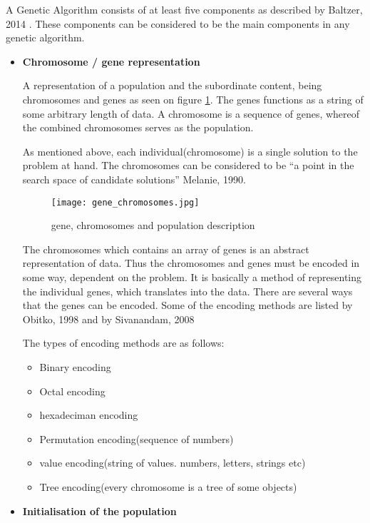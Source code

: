 A Genetic Algorithm consists of at least five components as described by Baltzer, 2014 \cite{Baltzer2014}. These components can be considered to be the main components in any genetic algorithm.
\begin{itemize}
\item \textbf{Chromosome / gene representation}

A representation of a population and the subordinate content, being chromosomes and genes as seen on figure \ref{fig:gene}.
The genes functions as a string of some arbitrary length of data. A chromosome is a sequence of genes, whereof the combined chromosomes serves as the population. \cite[pp. 41]{Sivanandam2008} 

As mentioned above, each individual(chromosome) is a single solution to the problem at hand. The chromosomes can be considered to be \enquote{a point in the search space of candidate solutions} \cite[pp. 7]{Melanie1990} Melanie, 1990.
	

\begin{figure}[!h]
\centering
\texttt{[image: gene\_chromosomes.jpg]}
\caption{gene, chromosomes and population description}
\label{fig:gene}
\end{figure}

The chromosomes which contains an array of genes is an abstract representation of data. Thus the chromosomes and genes must be encoded in some way, dependent on the problem. It is basically a method of representing the individual genes, which translates into the data.
There are several ways that the genes can be encoded. Some of the encoding methods are listed by Obitko, 1998 \cite{Marek1998} and by Sivanandam, 2008 \cite[pp. 43]{Sivanandam2008}

The types of encoding methods are as follows:
\begin{itemize}
\item Binary encoding
\item Octal encoding
\item hexadeciman encoding
\item Permutation encoding(sequence of numbers)
\item value encoding(string of values. numbers, letters, strings etc)
\item Tree encoding(every chromosome is a tree of some objects)
\end{itemize}


\item \textbf{Initialisation of the population}


\end{itemize}
